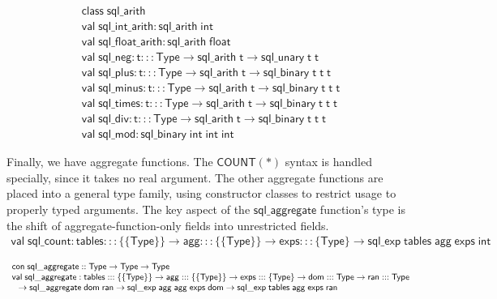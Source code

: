 \documentclass{article}
\newcommand{\mt}[1]{\mathsf{#1}}
\begin{document}
$$\begin{array}{l}
  \mt{class} \; \mt{sql\_arith} \\
  \mt{val} \; \mt{sql\_int\_arith} : \mt{sql\_arith} \; \mt{int} \\
  \mt{val} \; \mt{sql\_float\_arith} : \mt{sql\_arith} \; \mt{float} \\
  \mt{val} \; \mt{sql\_neg} : \mt{t} ::: \mt{Type} \to \mt{sql\_arith} \; \mt{t} \to \mt{sql\_unary} \; \mt{t} \; \mt{t} \\
  \mt{val} \; \mt{sql\_plus} : \mt{t} ::: \mt{Type} \to \mt{sql\_arith} \; \mt{t} \to \mt{sql\_binary} \; \mt{t} \; \mt{t} \; \mt{t} \\
  \mt{val} \; \mt{sql\_minus} : \mt{t} ::: \mt{Type} \to \mt{sql\_arith} \; \mt{t} \to \mt{sql\_binary} \; \mt{t} \; \mt{t} \; \mt{t} \\
  \mt{val} \; \mt{sql\_times} : \mt{t} ::: \mt{Type} \to \mt{sql\_arith} \; \mt{t} \to \mt{sql\_binary} \; \mt{t} \; \mt{t} \; \mt{t} \\
  \mt{val} \; \mt{sql\_div} : \mt{t} ::: \mt{Type} \to \mt{sql\_arith} \; \mt{t} \to \mt{sql\_binary} \; \mt{t} \; \mt{t} \; \mt{t} \\
  \mt{val} \; \mt{sql\_mod} : \mt{sql\_binary} \; \mt{int} \; \mt{int} \; \mt{int}
\end{array}$$

Finally, we have aggregate functions.  The $\mt{COUNT(\ast)}$ syntax is handled specially, since it takes no real argument.  The other aggregate functions are placed into a general type family, using constructor classes to restrict usage to properly typed arguments.  The key aspect of the $\mt{sql\_aggregate}$ function's type is the shift of aggregate-function-only fields into unrestricted fields.
$$\begin{array}{l}
  \mt{val} \; \mt{sql\_count} : \mt{tables} ::: \{\{\mt{Type}\}\} \to \mt{agg} ::: \{\{\mt{Type}\}\} \to \mt{exps} ::: \{\mt{Type}\} \to \mt{sql\_exp} \; \mt{tables} \; \mt{agg} \; \mt{exps} \; \mt{int}
\end{array}$$

$$\begin{array}{l}
  \mt{con} \; \mt{sql\_aggregate} :: \mt{Type} \to \mt{Type} \to \mt{Type} \\
  \mt{val} \; \mt{sql\_aggregate} : \mt{tables} ::: \{\{\mt{Type}\}\} \to \mt{agg} ::: \{\{\mt{Type}\}\} \to \mt{exps} ::: \{\mt{Type}\} \to \mt{dom} ::: \mt{Type} \to \mt{ran} ::: \mt{Type} \\
  \hspace{.1in} \to \mt{sql\_aggregate} \; \mt{dom} \; \mt{ran} \to \mt{sql\_exp} \; \mt{agg} \; \mt{agg} \; \mt{exps} \; \mt{dom} \to \mt{sql\_exp} \; \mt{tables} \; \mt{agg} \; \mt{exps} \; \mt{ran}
\end{array}$$
\end{document}
